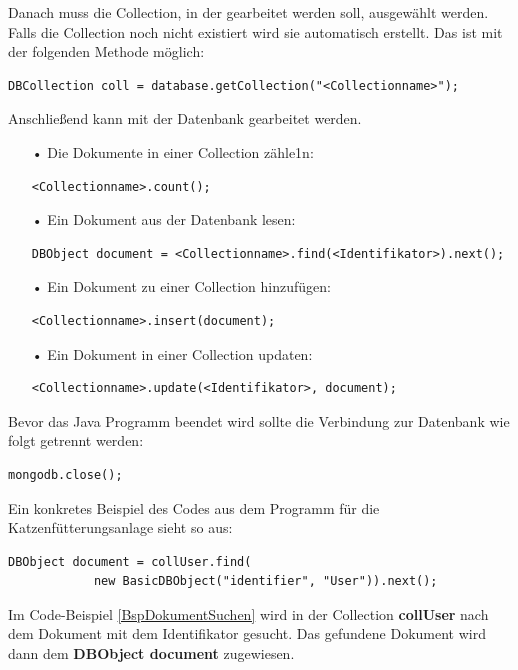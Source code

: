 Danach muss die Collection, in der gearbeitet werden soll, ausgewählt werden. Falls die Collection noch nicht existiert wird sie automatisch erstellt. Das ist mit der folgenden Methode möglich:
\begin{lstlisting}[style=JavaStyle, caption=Collection auswählen]
	DBCollection coll = database.getCollection("<Collectionname>");
\end{lstlisting}
Anschließend kann mit der Datenbank gearbeitet werden. 
\begin{itemize}
\item[•] Die Dokumente in einer Collection zähle1n:
\begin{lstlisting}[style=JavaStyle, caption=Anzahl der Collections zählen]
	<Collectionname>.count();
\end{lstlisting}
\item[•] Ein Dokument aus der Datenbank lesen:
\begin{lstlisting}[style=JavaStyle, caption=Nach Dokument suchen]
	DBObject document = <Collectionname>.find(<Identifikator>).next();
\end{lstlisting}
\item[•] Ein Dokument zu einer Collection hinzufügen:
\begin{lstlisting}[style=JavaStyle, caption=Ein Dokument hinzufügen]
	<Collectionname>.insert(document);
\end{lstlisting}	
\item[•] Ein Dokument in einer Collection updaten:
\begin{lstlisting}[style=JavaStyle, caption=Ein Dokument updaten]
	<Collectionname>.update(<Identifikator>, document);
\end{lstlisting}
\end{itemize}

Bevor das Java Programm beendet wird sollte die Verbindung zur Datenbank wie folgt getrennt werden: 
\begin{lstlisting}[style=JavaStyle, caption=Verbindung zur Datenbank trennen]
	mongodb.close();
\end{lstlisting}

Ein konkretes Beispiel des Codes aus dem Programm für die Katzenfütterungsanlage sieht so aus:
\begin{lstlisting}[style=JavaStyle, caption=Konkretes Beispiel: Dokument suchen, label=BspDokumentSuchen]
	DBObject document = collUser.find(
			new BasicDBObject("identifier", "User")).next();
\end{lstlisting}
Im Code-Beispiel \ref{BspDokumentSuchen} wird in der Collection \textbf{collUser} nach dem Dokument mit dem Identifikator \textbf{} gesucht. Das gefundene Dokument wird dann dem \textbf{DBObject document} zugewiesen. 


